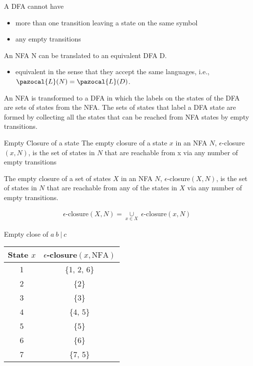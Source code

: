 A DFA cannot have 
\begin{itemize}
    \item more than one transition leaving a state on the same symbol
    \item any empty transitions
\end{itemize}
An NFA N can be translated to an equivalent DFA D.
\begin{itemize}
    \item equivalent in the sense that they accept the same languages, i.e., $\pazocal{L}(N) = \pazocal{L}(D)$.
\end{itemize}

An NFA is transformed to a DFA in which the labels on the states of the DFA are sets of states from the NFA.
The sets of states that label a DFA state are formed by collecting all the states that can be reached from NFA states by empty transitions. 

Empty Closure of a state
The empty closure of a state $x$ in an NFA $N$, $\epsilon$-closure$(x, N)$, is
the set of states in $N$ that are reachable from x via any number
of empty transitions

The empty closure of a set of states $X$ in an NFA $N$, $\epsilon$-closure$(X , N)$, is the set of states in $N$ that are reachable from any of the states in $X$ via any number of empty transitions. 

\begin{align*}
    \epsilon \text{-closure}(X, N) = \underset{x \in X}{\cup} \ \epsilon \text{-closure}(x, N)
\end{align*}

Empty close of $a \ b \ | \ c$

\begin{tabular}{|c|c|}
    \hline
    State $x$ & $\epsilon$-closure$(x, \text{NFA})$ \\
    \hline
    1 & \{1, 2, 6\} \\
    2 & \{2\} \\
    3 & \{3\} \\
    4 & \{4, 5\} \\
    5 & \{5\} \\
    6 & \{6\} \\
    7 & \{7, 5\} \\
    \hline
\end{tabular}

